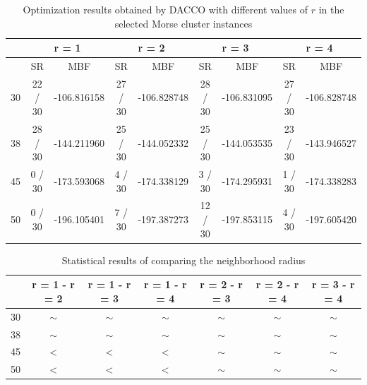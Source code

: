 		
		
		
		\begin{landscape}
			 \begin{table}[!htdp]
					\begin{center}
						\begin{tabular}{| c | c | c | c | c | c | c | c | c |}
							\hline
							~ & \multicolumn{2}{c|}{\textbf{r = 1}} & \multicolumn{2}{c|}{\textbf{r = 2}} & \multicolumn{2}{c|}{\textbf{r = 3}} & \multicolumn{2}{c|}{\textbf{r = 4}} \\ \hline
							~ & SR & MBF & SR & MBF & SR & MBF & SR & MBF \\ \hline
							30 & 22 / 30 & -106.816158 & 27 / 30 & -106.828748 & 28 / 30 & -106.831095 & 27 / 30 & -106.828748 \\ \hline
							38 & 28 / 30 & -144.211960 & 25 / 30 & -144.052332 & 25 / 30 & -144.053535 & 23 / 30 & -143.946527 \\ \hline
							45 & 0 / 30 & -173.593068 & 4 / 30 & -174.338129 & 3 / 30 & -174.295931& 1 / 30 & -174.338283 \\ \hline
							50 & 0 / 30 & -196.105401 & 7 / 30 & -197.387273 & 12 / 30 & -197.853115 & 4 / 30 & -197.605420 \\ \hline
						\end{tabular}
						\caption{Optimization results obtained by DACCO with different values of $r$ in the selected Morse cluster instances}
						\label{tab:neighborhood_radius_results}
					\end{center}
			\end{table}
		
			\begin{table}[!htdp]
					\begin{center}
						\begin{tabular}{| c | c | c | c | c | c | c |}
							\hline
							~& \textbf{r = 1 - r = 2} & \textbf{r = 1 - r = 3} & \textbf{r = 1 - r = 4} & \textbf{r = 2 - r = 3} & \textbf{r = 2 - r = 4} & \textbf{r = 3 - r = 4} \\ \hline
							30 & $\sim$ & $\sim$ & $\sim$ & $\sim$ & $\sim$ & $\sim$ \\ \hline
							38 & $\sim$ & $\sim$ & $\sim$ & $\sim$ & $\sim$ & $\sim$ \\ \hline
							45 & < & < & < & $\sim$ & $\sim$ & $\sim$ \\ \hline
							50 & < & < & < & $\sim$ & $\sim$ & $\sim$ \\ \hline
						\end{tabular}
						\caption{Statistical results of comparing the neighborhood radius}
						\label{tab:statistical_comparison_radius}
					\end{center}
			\end{table}
			
			\end{landscape}
			
